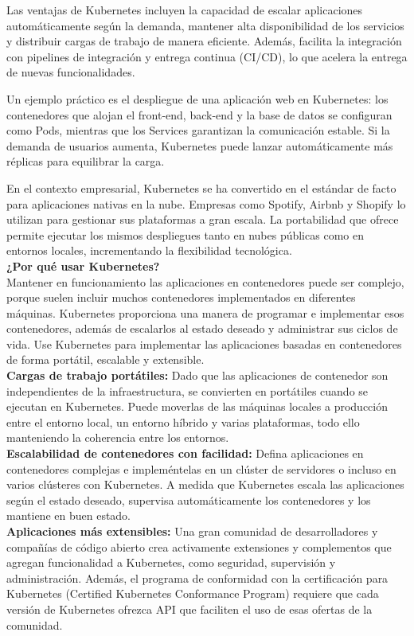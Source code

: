 \documentclass[12pt,letterpaper]{article}
\begin{document}
Las ventajas de Kubernetes incluyen la capacidad de escalar aplicaciones automáticamente según la demanda, mantener alta disponibilidad de los servicios y distribuir cargas de trabajo de manera eficiente. Además, facilita la integración con pipelines de integración y entrega continua (CI/CD), lo que acelera la entrega de nuevas funcionalidades. 

Un ejemplo práctico es el despliegue de una aplicación web en Kubernetes: los contenedores que alojan el front-end, back-end y la base de datos se configuran como Pods, mientras que los Services garantizan la comunicación estable. Si la demanda de usuarios aumenta, Kubernetes puede lanzar automáticamente más réplicas para equilibrar la carga. 

En el contexto empresarial, Kubernetes se ha convertido en el estándar de facto para aplicaciones nativas en la nube. Empresas como Spotify, Airbnb y Shopify lo utilizan para gestionar sus plataformas a gran escala. La portabilidad que ofrece permite ejecutar los mismos despliegues tanto en nubes públicas como en entornos locales, incrementando la flexibilidad tecnológica. \\

\textbf{¿Por qué usar Kubernetes?} \\
Mantener en funcionamiento las aplicaciones en contenedores puede ser complejo, porque suelen incluir muchos contenedores implementados en diferentes máquinas. Kubernetes proporciona una manera de programar e implementar esos contenedores, además de escalarlos al estado deseado y administrar sus ciclos de vida. Use Kubernetes para implementar las aplicaciones basadas en contenedores de forma portátil, escalable y extensible.\\

\textbf{Cargas de trabajo portátiles:} 
Dado que las aplicaciones de contenedor son independientes de la infraestructura, se convierten en portátiles cuando se ejecutan en Kubernetes. Puede moverlas de las máquinas locales a producción entre el entorno local, un entorno híbrido y varias plataformas, todo ello manteniendo la coherencia entre los entornos.\\
\textbf{Escalabilidad de contenedores con facilidad:} 
Defina aplicaciones en contenedores complejas e impleméntelas en un clúster de servidores o incluso en varios clústeres con Kubernetes. A medida que Kubernetes escala las aplicaciones según el estado deseado, supervisa automáticamente los contenedores y los mantiene en buen estado.\\
\textbf{Aplicaciones más extensibles:} 
Una gran comunidad de desarrolladores y compañías de código abierto crea activamente extensiones y complementos que agregan funcionalidad a Kubernetes, como seguridad, supervisión y administración. Además, el programa de conformidad con la certificación para Kubernetes (Certified Kubernetes Conformance Program) requiere que cada versión de Kubernetes ofrezca API que faciliten el uso de esas ofertas de la comunidad.
\end{document}
